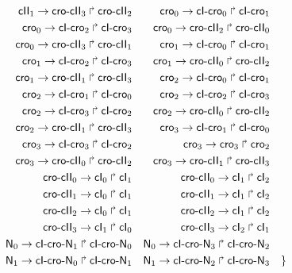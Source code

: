 \begin{align*}
  \PHfrappe{\cII_1}{\crocII_3}{\crocII_2} &&
  \PHfrappe{\cro_0}{\cIcro_0}{\cIcro_1} \\
  \PHfrappe{\cro_0}{\cIcro_2}{\cIcro_3} &&
  \PHfrappe{\cro_0}{\crocII_2}{\crocII_0} \\
  \PHfrappe{\cro_0}{\crocII_3}{\crocII_1} &&
  \PHfrappe{\cro_1}{\cIcro_0}{\cIcro_1} \\
  \PHfrappe{\cro_1}{\cIcro_2}{\cIcro_3} &&
  \PHfrappe{\cro_1}{\crocII_0}{\crocII_2} \\
  \PHfrappe{\cro_1}{\crocII_1}{\crocII_3} &&
  \PHfrappe{\cro_2}{\cIcro_0}{\cIcro_1} \\
  \PHfrappe{\cro_2}{\cIcro_1}{\cIcro_0} &&
  \PHfrappe{\cro_2}{\cIcro_2}{\cIcro_3} \\
  \PHfrappe{\cro_2}{\cIcro_3}{\cIcro_2} &&
  \PHfrappe{\cro_2}{\crocII_0}{\crocII_2} \\
  \PHfrappe{\cro_2}{\crocII_1}{\crocII_3} &&
  \PHfrappe{\cro_3}{\cIcro_1}{\cIcro_0} \\
  \PHfrappe{\cro_3}{\cIcro_3}{\cIcro_2} &&
  \PHfrappe{\cro_3}{\cro_3}{\cro_2} \\
  \PHfrappe{\cro_3}{\crocII_0}{\crocII_2} &&
  \PHfrappe{\cro_3}{\crocII_1}{\crocII_3} \\
  \PHfrappe{\crocII_0}{\cI_0}{\cI_1} &&
  \PHfrappe{\crocII_0}{\cI_1}{\cI_2} \\
  \PHfrappe{\crocII_1}{\cI_0}{\cI_1} &&
  \PHfrappe{\crocII_1}{\cI_1}{\cI_2} \\
  \PHfrappe{\crocII_2}{\cI_0}{\cI_1} &&
  \PHfrappe{\crocII_2}{\cI_1}{\cI_2} \\
  \PHfrappe{\crocII_3}{\cI_1}{\cI_0} &&
  \PHfrappe{\crocII_3}{\cI_2}{\cI_1} \\
  \PHfrappe{\N_0}{\cIcroN_1}{\cIcroN_0} &&
  \PHfrappe{\N_0}{\cIcroN_3}{\cIcroN_2} \\
  \PHfrappe{\N_1}{\cIcroN_0}{\cIcroN_1} &&
  \PHfrappe{\N_1}{\cIcroN_2}{\cIcroN_3} && \}
\end{align*}
